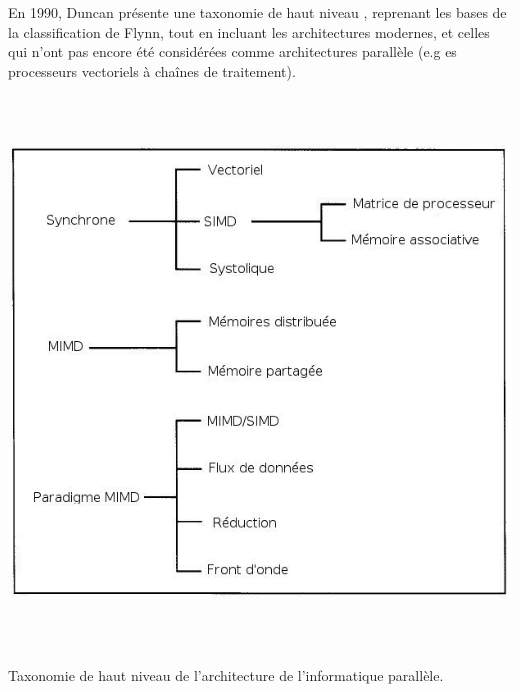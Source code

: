 \documentclass[a4paper,12pt]{report}
\theoremstyle{plain}				%
\theoremstyle{definition}				%
\begin{document}
En 1990, Duncan présente une taxonomie de haut niveau \cite{44900},
reprenant les bases de la classification de Flynn, tout en incluant
les architectures modernes, et celles qui n'ont pas encore été
considérées comme architectures parallèle (e.g es processeurs
vectoriels à chaînes de traitement).

{\centering
\includegraphics[width=16.272cm,height=14.605cm]{Biblio_PCmax_Rendu_Taxonomie_Duncan.jpg}
\par}
{\centering
Taxonomie de haut niveau de l'architecture de l'informatique parallèle.
\par}

\bigskip
\end{document}
